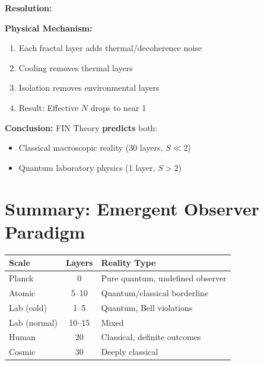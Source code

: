 \documentclass[11pt, a4paper]{article}
\theoremstyle{remark}
\begin{document}
\textbf{Resolution:}

\begin{center}
\end{center}

\textbf{Physical Mechanism:}
\begin{enumerate}
    \item Each fractal layer adds thermal/decoherence noise
    \item Cooling removes thermal layers
    \item Isolation removes environmental layers
    \item Result: Effective $N$ drops to near 1
\end{enumerate}

\textbf{Conclusion:} FIN Theory \textbf{predicts} both:
\begin{itemize}
    \item Classical macroscopic reality (30 layers, $S \ll 2$)
    \item Quantum laboratory physics (1 layer, $S > 2$)
\end{itemize}

\section{Summary: Emergent Observer Paradigm}

\begin{center}
\begin{tabular}{|l|c|l|}
\hline
\textbf{Scale} & \textbf{Layers} & \textbf{Reality Type} \\
\hline
Planck & 0 & Pure quantum, undefined observer \\
Atomic & 5--10 & Quantum/classical borderline \\
Lab (cold) & 1--5 & Quantum, Bell violations \\
Lab (normal) & 10--15 & Mixed \\
Human & 20 & Classical, definite outcomes \\
Cosmic & 30 & Deeply classical \\
\hline
\end{tabular}
\end{center}
\end{document}
